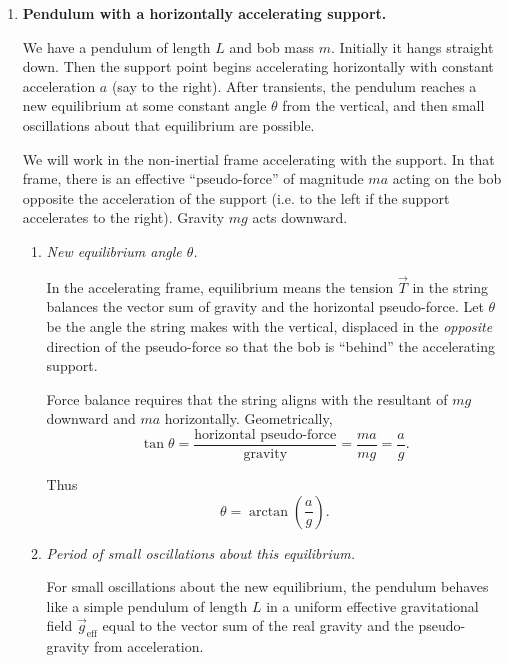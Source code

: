 \documentclass[12pt]{article}
\begin{document}
\begin{enumerate}
But $E = \tfrac{1}{2} m \omega_0^2 A^2$, so
\[
\langle K \rangle = \frac{E}{2},
\qquad
\langle U \rangle = \frac{E}{2}.
\]

Conclusion: over one complete cycle, the oscillator spends half its energy in kinetic form (on average) and half in potential form. The averages are equal and each is $E/2$.


\item \textbf{Pendulum with a horizontally accelerating support.}

We have a pendulum of length $L$ and bob mass $m$. Initially it hangs straight down. Then the support point begins accelerating horizontally with constant acceleration $a$ (say to the right). After transients, the pendulum reaches a new equilibrium at some constant angle $\theta$ from the vertical, and then small oscillations about that equilibrium are possible.

We will work in the non-inertial frame accelerating with the support. In that frame, there is an effective ``pseudo-force'' of magnitude $ma$ acting on the bob opposite the acceleration of the support (i.e. to the left if the support accelerates to the right). Gravity $mg$ acts downward.

\begin{enumerate}
    \item \textit{New equilibrium angle $\theta$.}

    In the accelerating frame, equilibrium means the tension $\vec{T}$ in the string balances the vector sum of gravity and the horizontal pseudo-force. Let $\theta$ be the angle the string makes with the vertical, displaced in the \emph{opposite} direction of the pseudo-force so that the bob is ``behind'' the accelerating support.

    Force balance requires that the string aligns with the resultant of $mg$ downward and $ma$ horizontally. Geometrically,
    \[
    \tan \theta = \frac{\text{horizontal pseudo-force}}{\text{gravity}} = \frac{ma}{mg} = \frac{a}{g}.
    \]

    Thus
    \[
    \theta = \arctan\!\left(\frac{a}{g}\right).
    \]

    \item \textit{Period of small oscillations about this equilibrium.}

    For small oscillations about the new equilibrium, the pendulum behaves like a simple pendulum of length $L$ in a uniform effective gravitational field $\vec{g}_\text{eff}$ equal to the vector sum of the real gravity and the pseudo-gravity from acceleration.


\end{enumerate}
\end{enumerate}
\end{document}
